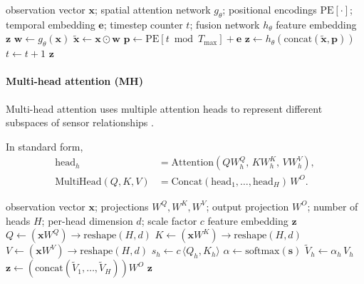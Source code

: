 \documentclass[sn-basic]{sn-jnl} %
\begin{document}
\begin{algorithm}[t]
\caption{Temporal attention feature extractor (forward pass)}
\label{alg:tp_forward}
\begin{algorithmic}[1]
\Require observation vector $\mathbf{x}$; spatial attention network $g_\theta$; positional encodings $\mathrm{PE}[\cdot]$; temporal embedding $\mathbf{e}$; timestep counter $t$; fusion network $h_\theta$
\Ensure feature embedding $\mathbf{z}$
\State $\mathbf{w} \gets g_\theta(\mathbf{x})$ 
\State $\tilde{\mathbf{x}} \gets \mathbf{x} \odot \mathbf{w}$
\State $\mathbf{p} \gets \mathrm{PE}[t \bmod T_{\max}] + \mathbf{e}$
\State $\mathbf{z} \gets h_\theta(\mathrm{concat}(\tilde{\mathbf{x}},\mathbf{p}))$
\State $t \gets t+1$
\State \Return $\mathbf{z}$
\end{algorithmic}
\end{algorithm}

\paragraph{Multi-head attention (MH)}
Multi-head attention uses multiple attention heads to represent different subspaces of sensor relationships \cite{Vaswani2017}.

In standard form,
\begin{align}
\mathrm{head}_h &= \mathrm{Attention}(QW_h^Q,\,KW_h^K,\,VW_h^V),\\
\mathrm{MultiHead}(Q,K,V) &= \mathrm{Concat}(\mathrm{head}_1,\ldots,\mathrm{head}_H)\,W^O.
\end{align}

\begin{algorithm}[t]
\caption{Multi-head attention feature extractor (forward pass; head-gating over $H$ heads)}
\label{alg:mh_forward}
\begin{algorithmic}[1]
\Require observation vector $\mathbf{x}$; projections $W^Q,W^K,W^V$; output projection $W^O$; number of heads $H$; per-head dimension $d$; scale factor $c$
\Ensure feature embedding $\mathbf{z}$
\State $Q \gets (\mathbf{x}W^Q) \rightarrow \text{reshape}(H, d)$
\State $K \gets (\mathbf{x}W^K) \rightarrow \text{reshape}(H, d)$
\State $V \gets (\mathbf{x}W^V) \rightarrow \text{reshape}(H, d)$
		\State $s_h \gets c\,\langle Q_h, K_h\rangle$
\EndFor
\State $\alpha \gets \mathrm{softmax}(\mathbf{s})$ 
		\State $\tilde{V}_h \gets \alpha_h\,V_h$
\EndFor
\State $\mathbf{z} \gets (\mathrm{concat}(\tilde{V}_1,\ldots,\tilde{V}_H))W^O$
\State \Return $\mathbf{z}$
\end{algorithmic}
\end{algorithm}
\end{document}
